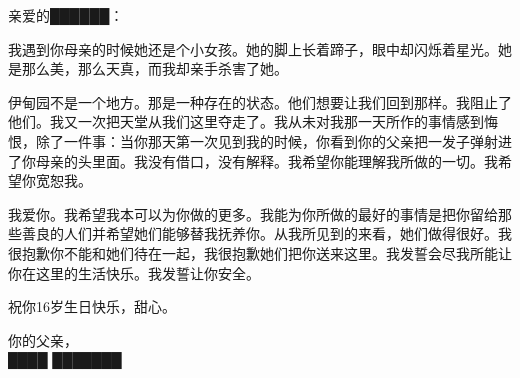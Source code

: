 \hr


\begin{scpbox}

亲爱的██████：

我遇到你母亲的时候她还是个小女孩。她的脚上长着蹄子，眼中却闪烁着星光。她是那么美，那么天真，而我却亲手杀害了她。

伊甸园不是一个地方。那是一种存在的状态。他们想要让我们回到那样。我阻止了他们。我又一次把天堂从我们这里夺走了。我从未对我那一天所作的事情感到悔恨，除了一件事：当你那天第一次见到我的时候，你看到你的父亲把一发子弹射进了你母亲的头里面。我没有借口，没有解释。我希望你能理解我所做的一切。我希望你宽恕我。

我爱你。我希望我本可以为你做的更多。我能为你所做的最好的事情是把你留给那些善良的人们并希望她们能够替我抚养你。从我所见到的来看，她们做得很好。我很抱歉你不能和她们待在一起，我很抱歉她们把你送来这里。我发誓会尽我所能让你在这里的生活快乐。我发誓让你安全。

祝你16岁生日快乐，甜心。

你的父亲，\\
████ ███████

\end{scpbox}
